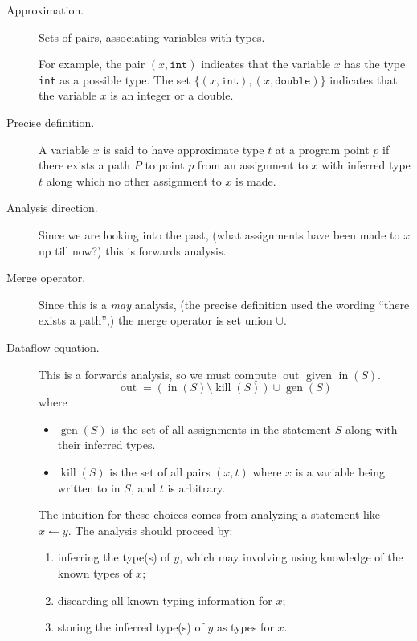 \documentclass[11pt,letterpaper]{article}
\DeclareMathOperator{\inputOp}{in}
\DeclareMathOperator{\outputOp}{out}
\DeclareMathOperator{\killOp}{kill}
\DeclareMathOperator{\genOp}{gen}
\newcommand{\In}[1]{\inputOp{(#1)}}
\newcommand{\Out}[1]{\outputOp}{(#1)}
\newcommand{\Kill}[1]{\killOp{(#1)}}
\newcommand{\Gen}[1]{\genOp{(#1)}}
\newcommand{\intty}{\mathtt{int}}
\newcommand{\doublety}{\mathtt{double}}
\begin{document}
\begin{description}
    \item[Approximation.]
        Sets of pairs, associating variables with types.

        For example, the pair $(x, \intty)$ indicates that the
        variable $x$ has the type \texttt{int} as a possible type. The set
        $\{(x, \intty), (x, \doublety)\}$ indicates that the variable $x$ is an
        integer or a double.

    \item[Precise definition.]
        A variable $x$ is said to have approximate type $t$ at a program point
        $p$ if there exists a path $P$ to point $p$ from an assignment to $x$
        with inferred type $t$ along which no other assignment to $x$ is made.

    \item[Analysis direction.]
        Since we are looking into the past, (what assignments have been made to
        $x$ up till now?) this is forwards analysis.

    \item[Merge operator.]
        Since this is a \emph{may} analysis, (the precise definition used the
        wording ``there exists a path'',) the merge operator is set union
        $\cup$.

    \item[Dataflow equation.]
        This is a forwards analysis, so we must compute $\Out{S}$ given
        $\In{S}$.
        \begin{equation*}
            \Out{S} = \left(\In{S} \setminus \Kill{S}\right) \cup \Gen{S}
        \end{equation*}
        where
        \begin{itemize}
            \item $\Gen{S}$ is the set of all assignments in the statement $S$
                along with their inferred types.

            \item $\Kill{S}$ is the set of all pairs $(x, t)$ where $x$ is a
                variable being written to in $S$, and $t$ is arbitrary.
        \end{itemize}

        The intuition for these choices comes from analyzing a statement like
        $x \gets y$. The analysis should proceed by:
        \begin{enumerate}
            \item inferring the type(s) of $y$, which may involving using
                knowledge of the known types of $x$;
            \item discarding all known typing information for $x$;
            \item storing the inferred type(s) of $y$ as types for $x$.
        \end{enumerate}


\end{description}
\end{document}
